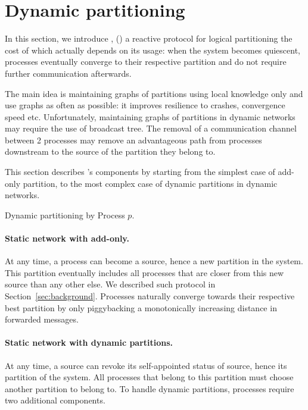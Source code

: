 
\section{Dynamic partitioning}
\label{sec:proposal}


In this section, we introduce \NAME, () a reactive
protocol for logical partitioning the cost of which actually depends
on its usage: when the system becomes quiescent, processes eventually
converge to their respective partition and do not require further
communication afterwards.

The main idea is maintaining graphs of partitions using local
knowledge only and use graphs as often as possible: it improves
resilience to crashes, convergence speed etc. Unfortunately,
maintaining graphs of partitions in dynamic networks may require the
use of broadcast tree. The removal of a communication channel between
2 processes may remove an advantageous path from processes downstream
to the source of the partition they belong to.

This section describes \NAME's components by starting from the
simplest case of add-only partition, to the most complex case of
dynamic partitions in dynamic networks. 


\begin{algorithm}
  
  \caption{\label{algo:adddelundo}Dynamic partitioning by Process $p$.}
\end{algorithm}


\paragraph{Static network with add-only.}
At any time, a process can become a source, hence  a
new partition in the system. This partition eventually includes all
processes that are closer from this new source than any other else. We
described such protocol in Section~\ref{sec:background}. Processes
naturally converge towards their respective best partition by only
piggybacking a monotonically increasing distance in forwarded
messages.  

\paragraph{Static network with dynamic partitions.}
At any time, a source can revoke its self-appointed status of source,
hence  its partition of the system. All processes that
belong to this partition must choose another partition to belong to.
To handle dynamic partitions, processes require two additional
components.

